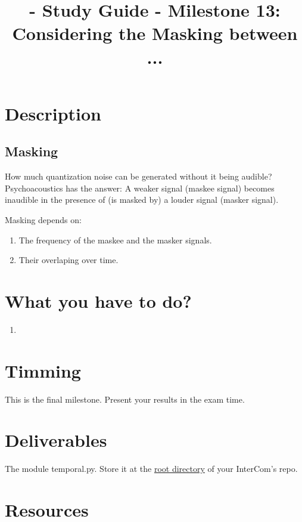 
\title{\TM{} - Study Guide - Milestone 13: Considering the Masking between ...}

\maketitle

\section{Description}

\subsection{Masking}
How much quantization noise can be generated without it being audible?
Psychoacoustics has the answer: A weaker signal (maskee signal) becomes
inaudible in the presence of (is masked by) a louder signal (masker signal). 

Masking depends on:
\begin{enumerate}
\item The frequency of the maskee and the masker signals.
\item Their overlaping over time.
\end{enumerate}

  
\section{What you have to do?}

\begin{enumerate}
\item
\end{enumerate}

\section{Timming}

This is the final milestone. Present your results in the exam time.

\section{Deliverables}

The module temporal.py. Store it at the
\href{https://github.com/Tecnologias-multimedia/intercom}{root
  directory} of your InterCom's repo.

\section{Resources}



